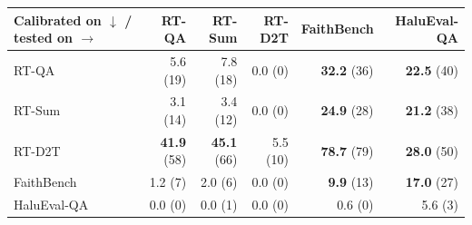 \begin{tabular}{lrrrrr}
\toprule
Calibrated on $\downarrow$ / tested on $\rightarrow$ & RT-QA & RT-Sum & RT-D2T & FaithBench & HaluEval-QA \\
\midrule
RT-QA & 5.6 (19) & 7.8 (18) & 0.0 (0) & \textbf{32.2} (36) & \textbf{22.5} (40) \\
RT-Sum & 3.1 (14) & 3.4 (12) & 0.0 (0) & \textbf{24.9} (28) & \textbf{21.2} (38) \\
RT-D2T & \textbf{41.9} (58) & \textbf{45.1} (66) & 5.5 (10) & \textbf{78.7} (79) & \textbf{28.0} (50) \\
FaithBench & 1.2 (7) & 2.0 (6) & 0.0 (0) & \textbf{9.9} (13) & \textbf{17.0} (27) \\
HaluEval-QA & 0.0 (0) & 0.0 (1) & 0.0 (0) & 0.6 (0) & 5.6 (3) \\
\bottomrule
\end{tabular}
